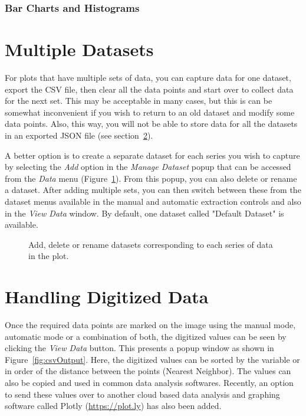 \documentclass[letterpaper, 11pt]{article}
\begin{document}
\subsubsection{Bar Charts and Histograms}

\section{Multiple Datasets}
\label{sec:multipleDatasets}
For plots that have multiple sets of data, you can capture data for one dataset, export the CSV file, then clear all the data points and start over to collect data for the next set. This may be acceptable in many cases, but this is can be somewhat inconvenient if you wish to return to an old dataset and modify some data points. Also, this way, you will not be able to store data for all the datasets in an exported JSON file (see section~\ref{sec:csvData}). 

A better option is to create a separate dataset for each series you wish to capture by selecting the \emph{Add} option in the \emph{Manage Dataset} popup that can be accessed from the \emph{Data} menu (Figure~\ref{fig:manageDatasets}). From this popup, you can also delete or rename a dataset. After adding multiple sets, you can then switch between these from the dataset menus available in the manual and automatic extraction controls and also in the \emph{View Data} window. By default, one dataset called "Default Dataset" is available.
\begin{figure}[h]
\begin{center}
\caption{Add, delete or rename datasets corresponding to each series of data in the plot.}
\label{fig:manageDatasets}
\end{center}
\end{figure}

 
\section{Handling Digitized Data}
\label{sec:csvData}
Once the required data points are marked on the image using the manual mode, automatic mode or a combination of both, the digitized values can be seen by clicking the \emph{View Data} button. This presents a popup window as shown in Figure~\ref{fig:csvOutput}. Here, the digitized values can be sorted by the variable or in order of the distance between the points (Nearest Neighbor). The values can also be copied and used in common data analysis softwares. Recently, an option to send these values over to another cloud based data analysis and graphing software called Plotly (\url{https://plot.ly}) has also been added.
 
\end{document}
